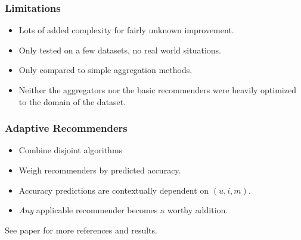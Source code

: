 \documentclass[screen]{beamer}
\begin{document}
\begin{frame}
  \frametitle{Limitations}
  \begin{itemize}
    \item Lots of added complexity for fairly unknown improvement.
    \item Only tested on a few datasets, no real world situations.
    \item Only compared to simple aggregation methods.
    \item Neither the aggregators nor the basic recommenders were
      heavily optimized to the domain of the dataset.
  \end{itemize}
\end{frame}

\begin{frame}
  \frametitle{Adaptive Recommenders}
  \begin{itemize}
    \item Combine disjoint algorithms
    \item Weigh recommenders by predicted accuracy.
    \item Accuracy predictions are contextually dependent on $(u,i,m)$.
    \item \emph{Any} applicable recommender becomes a worthy addition.
  \end{itemize}
  \vspace{2em}
  See paper for more references and results.
\end{frame}
\end{document}
